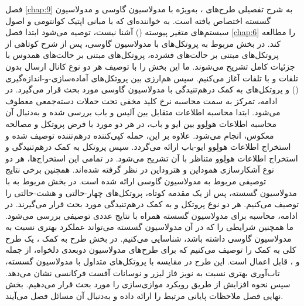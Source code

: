 فصل \ref{chap:9} به شرح تفصیلی طرح‌های ، به‌ویژه با مدولاسیون گاوسی و مدولاسیون گسسته اختصاص یافته است. به خواننده‌ای که با مبانی اپتیک کوانتومی و اصول سیستم‌های متغیر پیوسته () آشنا نیست، توصیه می‌شود ابتدا فصل \ref{chap:6} را مطالعه کند. در بخش مربوط به پروتکل‌های  با مدولاسیون گاوسی، پس از شرح کوتاهی از پروتکل‌های مبتنی بر حالت‌های فشرده، پروتکل‌های مبتنی بر حالت‌های همدوس با جزئیات کامل تشریح می‌شوند. ما این بخش را با توصیف هر دو نوع کانال ارسال بدون تلفات و با تلفات آغاز می‌کنیم. سپس هم‌ارزی بین پروتکل‌های آماده‌سازی-و-اندازه‌گیری () و پروتکل‌های به کمک درهم‌تنیدگی با مدولاسیون گاوسی مورد بحث قرار می‌گیرد. در ادامه، تمرکز به سمت محاسبه نرخ کلید مخفی تحت حملات دسته‌جمعی معطوف می‌شود. ابتدا محاسبه اطلاعات متقابل بین آلیس و باب بررسی شده و به‌دنبال آن محاسبه اطلاعات هولِوو بین ایو و باب، در هر دو مورد با فرض پروتکل  و مصالحه معکوس، انجام می‌شود. علاوه‌ بر این، حمله کپی‌کننده درهم‌تننده توصیف شده و استخراج اطلاعات هولِوو ایو-باب ارائه می‌گردد. سپس پروتکل به کمک درهم‌تنیدگی و استخراج اطلاعات هولِوو متناظر با آن تشریح می‌شود. در تمامی این استخراج‌ها، هر دو نوع آشکارسازی هموداین و هتروداین در نظر گرفته شده‌اند. همچنین برخی نتایج توصیفی  مربوط به مدولاسیون گاوسی ارائه شده است. در بخش مربوط به  با مدولاسیون گسسته، پس از یک مقدمه کوتاه، پروتکل‌های  چهار-حالتی و هشت-حالتی را توصیف می‌کنیم. هر دو نوع پروتکل  و به کمک درهم‌تنیدگی مورد بحث قرار می‌گیرند. در ادامه، محاسبه  برای مدولاسیون گسسته همراه با نتایج عددی توصیفی بررسی می‌شود. ما همچنین شرایطی را که در آن مدولاسیون گسسته می‌تواند عملکرد بهتری نسبت به مدولاسیون گاوسی داشته باشد، شناسایی می‌کنیم. در بخش طرح  به کمک ، یک طرح کلی به کمک  را توصیف می‌کنیم که برای طرح‌های مدولاسیون دوبعدی دلخواه، از جمله  و ، قابل اعمال است. این طرح در مقایسه با پروتکل‌های  متداول با مدولاسیون گسسته، تاب‌آوری بهتری نسبت به نویز فاز لیزر و نوسانات آفست فرکانسی نشان می‌دهد. سپس نحوه افزایش  از طریق رویکرد موازی‌سازی را مورد بحث قرار می‌دهیم. بخش نهایی فصل ملاحظات پایانی مرتبط را ارائه داده و به‌دنبال آن مسائل فصل می‌آیند.

